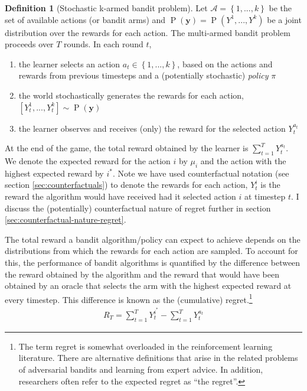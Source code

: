 \documentclass[11pt,a4paper,twoside]{report}
\newcommand{\actionspace}{\mathcal{A}}
\newcommand{\set}[1]{\left\{#1\right\}}
\newcommand{\eqn}[1]{\begin{align}#1\end{align}}
\renewcommand{\P}[1]{\operatorname{P}\left(#1\right)}
\newcommand{\cf}[2]{{#1}^{#2}}
\newcommand{\cfb}[2]{{#1}_t^{#2}} %
\renewcommand{\vec}[1]{\boldsymbol{#1}}
\newcommand{\rawregret}{R_{T}} %
\newcommand{\quotes}[1]{``#1''}
\theoremstyle{plain}
\theoremstyle{definition}
\newtheorem{definition}[theorem]{Definition}
\begin{document}
\vspace{0.5cm}
\begin{definition}[Stochastic k-armed bandit problem]
Let $\actionspace = \set{1,...,k}$ be the set of available actions (or bandit arms) and $\P{\vec{y}} = \P{\cf{Y}{1},...,\cf{Y}{k}}$ be a joint distribution over the rewards for each action. The multi-armed bandit problem proceeds over $T$ rounds. In each round $t$, 
\begin{enumerate}
\item the learner selects an action $a_{t} \in \set{1,...,k}$, based on the actions and rewards from previous timesteps and a (potentially stochastic) \emph{policy} $\pi$
\item the world stochastically generates the rewards for each action, $[\cfb{Y}{1},...,\cfb{Y}{k}] \sim \P{\vec{y}}$
\item the learner observes and receives (only) the reward for the selected action $\cfb{Y}{a_t}$ 
\end{enumerate}

At the end of the game, the total reward obtained by the learner is $\sum_{t=1}^T \cfb{Y}{a_t}$. We denote the expected reward for the action $i$ by $\mu_i$ and the action with the highest expected reward by $i^*$. Note we have used counterfactual notation (see section \ref{sec:counterfactuals}) to denote the rewards for each action, $\cfb{Y}{i}$ is the reward the algorithm would have received had it selected action $i$ at timestep $t$. I discuss the (potentially) counterfactual nature of regret further in section \ref{sec:counterfactual-nature-regret}.
\end{definition} 


The total reward a bandit algorithm/policy can expect to achieve depends on the distributions from which the rewards for each action are sampled. To account for this, the performance of bandit algorithms is quantified by the difference between the reward obtained by the algorithm and the reward that would have been obtained by an oracle that selects the arm with the highest expected reward at every timestep. This difference is known as the (cumulative) regret.\footnote{The term regret is somewhat overloaded in the reinforcement learning literature. There are alternative definitions that arise in the related problems of adversarial bandits and learning from expert advice. In addition, researchers often refer to the expected regret as \quotes{the regret}.}
\eqn{
\label{eqn:raw_regret}
\rawregret = \sum_{t=1}^T \cfb{Y}{i^*} - \sum_{t=1}^T \cfb{Y}{a_t}
}
\end{document}
